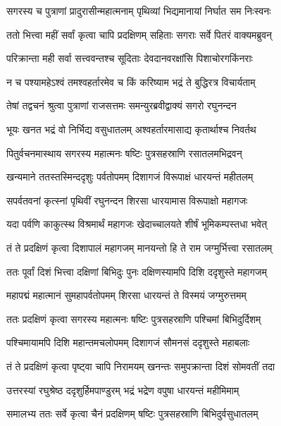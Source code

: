 \twolineshloka
{सगरस्य च पुत्राणां प्रादुरासीन्महात्मनाम्}
{पृथिव्यां भिद्यमानायां निर्घात सम निःस्वनः} %

\twolineshloka
{ततो भित्त्वा महीं सर्वां कृत्वा चापि प्रदक्षिणम्}
{सहिताः सगराः सर्वे पितरं वाक्यमब्रुवन्} %

\twolineshloka
{परिक्रान्ता मही सर्वा सत्त्ववन्तश्च सूदिताः}
{देवदानवरक्षांसि पिशाचोरगकिंनराः} %

\twolineshloka
{न च पश्यामहेऽश्वं तमश्वहर्तारमेव च}
{किं करिष्याम भद्रं ते बुद्धिरत्र विचार्यताम्} %

\twolineshloka
{तेषां तद्वचनं श्रुत्वा पुत्राणां राजसत्तमः}
{समन्युरब्रवीद्वाक्यं सगरो रघुनन्दन} %

\twolineshloka
{भूयः खनत भद्रं वो निर्भिद्य वसुधातलम्}
{अश्वहर्तारमासाद्य कृतार्थाश्च निवर्तथ} %

\twolineshloka
{पितुर्वचनमास्थाय सगरस्य महात्मनः}
{षष्टिः पुत्रसहस्राणि रसातलमभिद्रवन्} %

\twolineshloka
{खन्यमाने ततस्तस्मिन्ददृशुः पर्वतोपमम्}
{दिशागजं विरूपाक्षं धारयन्तं महीतलम्} %

\twolineshloka
{सपर्वतवनां कृत्स्नां पृथिवीं रघुनन्दन}
{शिरसा धारयामास विरूपाक्षो महागजः} %

\twolineshloka
{यदा पर्वणि काकुत्स्थ विश्रमार्थं महागजः}
{खेदाच्चालयते शीर्षं भूमिकम्पस्तधा भवेत्} %

\twolineshloka
{तं ते प्रदक्षिणं कृत्वा दिशापालं महागजम्}
{मानयन्तो हि ते राम जग्मुर्भित्त्वा रसातलम्} %

\twolineshloka
{ततः पूर्वां दिशं भित्त्वा दक्षिणां बिभिदुः पुनः}
{दक्षिणस्यामपि दिशि ददृशुस्ते महागजम्} %

\twolineshloka
{महापद्मं महात्मानं सुमहापर्वतोपमम्}
{शिरसा धारयन्तं ते विस्मयं जग्मुरुत्तमम्} %

\twolineshloka
{ततः प्रदक्षिणं कृत्वा सगरस्य महात्मनः}
{षष्टिः पुत्रसहस्राणि पश्चिमां बिभिदुर्दिशम्} %

\twolineshloka
{पश्चिमायामपि दिशि महान्तमचलोपमम्}
{दिशागजं सौमनसं ददृशुस्ते महाबलाः} %

\twolineshloka
{तं ते प्रदक्षिणं कृत्वा पृष्ट्वा चापि निरामयम्}
{खनन्तः समुपक्रान्ता दिशं सोमवतीं तदा} %

\twolineshloka
{उत्तरस्यां रघुश्रेष्ठ ददृशुर्हिमपाण्डुरम्}
{भद्रं भद्रेण वपुषा धारयन्तं महीमिमाम्} %

\twolineshloka
{समालभ्य ततः सर्वे कृत्वा चैनं प्रदक्षिणम्}
{षष्टिः पुत्रसहस्राणि बिभिदुर्वसुधातलम्} %


